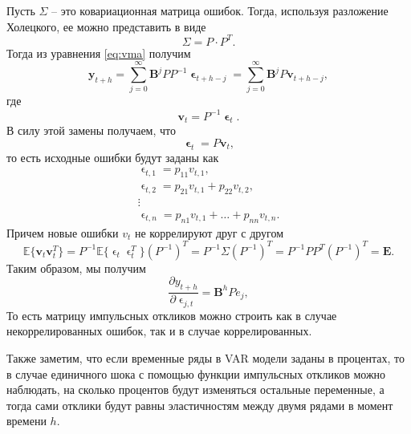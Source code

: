 \documentclass[a4paper, 14pt]{extreport}
\numberwithin{equation}{section}
\renewcommand{\epsilon}{\upvarepsilon}
\newcommand{\E}{\mathbb E}
\numberwithin{equation}{section}
\begin{document}
	Пусть $\Sigma$ -- это ковариационная матрица ошибок. Тогда, используя разложение Холецкого, ее можно представить в виде
	\begin{equation}
		\Sigma = P\cdot P^T.
	\end{equation}
	Тогда из уравнения \eqref{eq:vma} получим
	\begin{equation}
		\mathbf y_{t+h} = \sum_{j=0}^{\infty} \mathbf B^j  P  P^{-1} \mathbf \epsilon_{t+h-j} =\sum_{j=0}^{\infty} \mathbf B^j  P  \mathbf v_{t+h-j} ,
	\end{equation}
	где
	\begin{equation}
		 \mathbf v_t = P^{-1}  \mathbf \epsilon_t.
	\end{equation}
	В силу этой замены получаем, что
	\begin{equation}
		 \mathbf \epsilon_t = P \mathbf v_t,
	\end{equation}
	то есть исходные ошибки будут заданы как
	\begin{equation*}
		\begin{gathered}
			\epsilon_{t,1} = p_{11}v_{t,1},\\
			\epsilon_{t,2} = p_{21}v_{t,1} +  p_{22}v_{t,2},\\
			\vdots\\
			\epsilon_{t,n} = p_{n1}v_{t,1} +\ldots +  p_{nn}v_{t,n}.
		\end{gathered}
	\end{equation*}
	Причем новые ошибки $v_t$ не коррелируют друг с другом
	\begin{equation*}
		\E \{ \mathbf v_t  \mathbf v_t^T\} = P^{-1} \E\{\epsilon_t \epsilon_t^T\} (P^{-1})^T = P^{-1}\Sigma (P^{-1})^T =P^{-1}PP^T (P^{-1})^T =  \mathbf E.
	\end{equation*}
	Таким образом, мы получим
	\begin{equation}
		\dfrac{\partial y_{t+h}}{\partial \epsilon_{j,t}} = \mathbf B^h P e_j,
	\end{equation}
	То есть матрицу импульсных откликов можно строить как в случае некоррелированных ошибок, так и в случае коррелированных. 
	
	Также заметим, что если временные ряды в VAR модели заданы в процентах, то в случае единичного шока с помощью функции импульсных откликов можно наблюдать, на сколько процентов будут изменяться остальные переменные, а тогда сами отклики будут равны эластичностям между двумя рядами в момент времени $h$.
	
\end{document}
